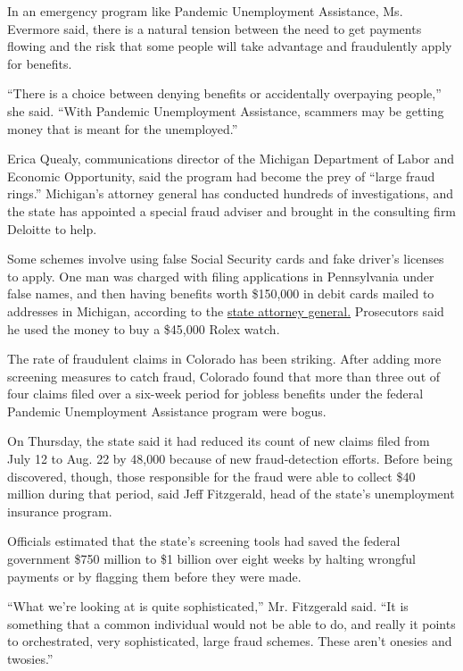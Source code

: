 In an emergency program like Pandemic Unemployment Assistance, Ms.
Evermore said, there is a natural tension between the need to get
payments flowing and the risk that some people will take advantage and
fraudulently apply for benefits.

``There is a choice between denying benefits or accidentally overpaying
people,'' she said. ``With Pandemic Unemployment Assistance, scammers
may be getting money that is meant for the unemployed.''

Erica Quealy, communications director of the Michigan Department of
Labor and Economic Opportunity, said the program had become the prey of
``large fraud rings.'' Michigan's attorney general has conducted
hundreds of investigations, and the state has appointed a special fraud
adviser and brought in the consulting firm Deloitte to help.

Some schemes involve using false Social Security cards and fake driver's
licenses to apply. One man was charged with filing applications in
Pennsylvania under false names, and then having benefits worth \$150,000
in debit cards mailed to addresses in Michigan, according to the
\href{https://www.oig.dol.gov/public/Press\%20Releases/Baker\%20complaint\%20pr.pdf}{state
attorney general.} Prosecutors said he used the money to buy a \$45,000
Rolex watch.

The rate of fraudulent claims in Colorado has been striking. After
adding more screening measures to catch fraud, Colorado found that more
than three out of four claims filed over a six-week period for jobless
benefits under the federal Pandemic Unemployment Assistance program were
bogus.

On Thursday, the state said it had reduced its count of new claims filed
from July 12 to Aug. 22 by 48,000 because of new fraud-detection
efforts. Before being discovered, though, those responsible for the
fraud were able to collect \$40 million during that period, said Jeff
Fitzgerald, head of the state's unemployment insurance program.

Officials estimated that the state's screening tools had saved the
federal government \$750 million to \$1 billion over eight weeks by
halting wrongful payments or by flagging them before they were made.

``What we're looking at is quite sophisticated,'' Mr. Fitzgerald said.
``It is something that a common individual would not be able to do, and
really it points to orchestrated, very sophisticated, large fraud
schemes. These aren't onesies and twosies.''

